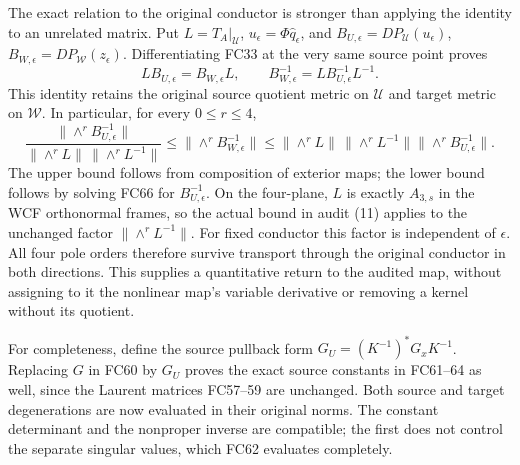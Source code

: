 \documentclass[11pt]{article}
\begin{document}
The exact relation to the original conductor is stronger than applying
the identity to an unrelated matrix. Put $L=T_A|_{\mathcal U}$,
$u_\epsilon=\Phi\widehat q_\epsilon$, and
$B_{U,\epsilon}=DP_{\mathcal U}(u_\epsilon)$,
$B_{W,\epsilon}=DP_{\mathcal W}(z_\epsilon)$. Differentiating FC33
at the very same source point proves
\[
 LB_{U,\epsilon}=B_{W,\epsilon}L,\qquad
 B_{W,\epsilon}^{-1}=L B_{U,\epsilon}^{-1}L^{-1}.
 \tag{FC66}
\]
This identity retains the original source quotient metric on $\mathcal U$
and target metric on $\mathcal W$. In particular, for every $0\le r\le4$,
\[
 \frac{\|\wedge^r B_{U,\epsilon}^{-1}\|}
 {\|\wedge^r L\|\,\|\wedge^r L^{-1}\|}
 \le\|\wedge^r B_{W,\epsilon}^{-1}\|
 \le\|\wedge^r L\|\,\|\wedge^r L^{-1}\|
       \|\wedge^r B_{U,\epsilon}^{-1}\|.
 \tag{FC67}
\]
The upper bound follows from composition of exterior maps; the lower
bound follows by solving FC66 for $B_{U,\epsilon}^{-1}$. On the four-plane,
$L$ is exactly $A_{3,s}$ in the WCF orthonormal frames, so the actual
bound in audit (11) applies to the unchanged factor
$\|\wedge^rL^{-1}\|$. For fixed conductor this factor is independent
of $\epsilon$. All four pole orders therefore survive transport through
the original conductor in both directions. This supplies a quantitative
return to the audited map, without assigning to it the nonlinear map's
variable derivative or removing a kernel without its quotient.

For completeness, define the source pullback form
$G_U=(K^{-1})^*G_xK^{-1}$. Replacing $G$ in FC60 by $G_U$ proves
the exact source constants in FC61--64 as well, since the Laurent
matrices FC57--59 are unchanged. Both source and target degenerations
are now evaluated in their original norms. The constant determinant
and the nonproper inverse are compatible; the first does not control
the separate singular values, which FC62 evaluates completely.
\end{document}

